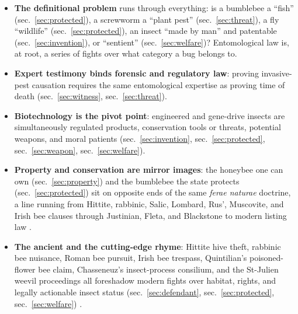 \documentclass[
  english,
]{article}
\providecommand{\tightlist}{%
  \setlength{\itemsep}{0pt}\setlength{\parskip}{0pt}}
\begin{document}
\begin{itemize}
\tightlist
\item
  \textbf{The definitional problem} runs through everything: is a
  bumblebee a ``fish'' (sec.~\ref{sec:protected}), a screwworm a ``plant
  pest'' (sec.~\ref{sec:threat}), a fly ``wildlife''
  (sec.~\ref{sec:protected}), an insect ``made by man'' and patentable
  (sec.~\ref{sec:invention}), or ``sentient'' (sec.~\ref{sec:welfare})?
  Entomological law is, at root, a series of fights over what category a
  bug belongs to.
\item
  \textbf{Expert testimony binds forensic and regulatory law}: proving
  invasive-pest causation requires the same entomological expertise as
  proving time of death (sec.~\ref{sec:witness}, sec.~\ref{sec:threat}).
\item
  \textbf{Biotechnology is the pivot point}: engineered and gene-drive
  insects are simultaneously regulated products, conservation tools or
  threats, potential weapons, and moral patients
  (sec.~\ref{sec:invention}, sec.~\ref{sec:protected},
  sec.~\ref{sec:weapon}, sec.~\ref{sec:welfare}).
\item
  \textbf{Property and conservation are mirror images}: the honeybee one
  can own (sec.~\ref{sec:property}) and the bumblebee the state protects
  (sec.~\ref{sec:protected}) sit on opposite ends of the same
  \emph{ferae naturae} doctrine, a line running from Hittite, rabbinic,
  Salic, Lombard, Rus', Muscovite, and Irish bee clauses through
  Justinian, Fleta, and Blackstone to modern listing law
  \citep{hittite_laws_bees, mishnah_bava_batra5_3_beehive, lex_salica_bees, edictum_rothari_bees, ruskaia_pravda_bees, sobornoe_ulozhenie1649_bees, bechbretha_bee_judgments, justinian533, fleta1290_bees, blackstone1766_bees}.
\item
  \textbf{The ancient and the cutting-edge rhyme}: Hittite hive theft,
  rabbinic bee nuisance, Roman bee pursuit, Irish bee trespass,
  Quintilian's poisoned-flower bee claim, Chasseneuz's insect-process
  consilium, and the St-Julien weevil proceedings all foreshadow modern
  fights over habitat, rights, and legally actionable insect status
  (sec.~\ref{sec:defendant}, sec.~\ref{sec:protected},
  sec.~\ref{sec:welfare})
  \citep{hittite_laws_bees, mishnah_bava_batra2_10_bees, justinian_digest41, bechbretha_bee_judgments, bechbretha1983, quintilian_decl13_bees, chasseneuz1581_consilia, bailly1668_monitoires_insectes, menabrea1846_animal_judgments, evans1884_bugs_beasts}.
\end{itemize}
\end{document}
